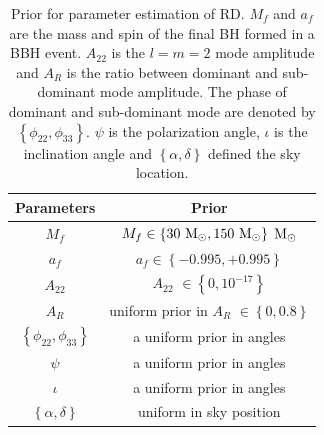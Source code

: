 \begin{table}
\centering
\begin{tabular}{|c|c| }
\hline
Parameters 		 & Prior \\ \hline
$M_{f}$                  & $M_{f} \in \left\lbrace 30 ~\mathrm{M}_\odot, 150 ~\mathrm{M}_\odot \right\rbrace $ $\mathrm{M}_\odot$       \\ 
$a_{f}$                  & $a_{f} \in \left\lbrace -0.995, +0.995  \right\rbrace $        \\
$A_{22}$                  &$A_{22}$ $\in \left\lbrace 0, 10^{-17}  \right\rbrace $          \\ 
$A_{R}$                 & uniform  prior in $A_{R}$ $\in \left\lbrace 0,0.8  \right\rbrace $          \\ \hline
$\left\lbrace \phi_{22}, \phi_{33}\right\rbrace$  & a uniform prior in angles \\ 
$\psi$ &a uniform prior in angles\\  \hline
$\iota$    & a uniform prior in angles    \\ 
$\left\lbrace \alpha, \delta \right\rbrace$    &  uniform in sky position  \\ \hline
\end{tabular}
\caption{Prior for parameter estimation of RD. $M_{f}$  and $a_{f}$ are the mass and spin of the final BH formed in a BBH event. $A_{22}$ is the $l=m=2$ mode amplitude and $A_{R}$ is the ratio between dominant and sub-dominant mode amplitude. The phase of dominant and sub-dominant mode are denoted by $\left\lbrace \phi_{22}, \phi_{33}\right\rbrace$. $\psi$ is the polarization angle, $\iota$ is the inclination angle and $\left\lbrace \alpha, \delta \right\rbrace$ defined the sky location. }
\end{table}





